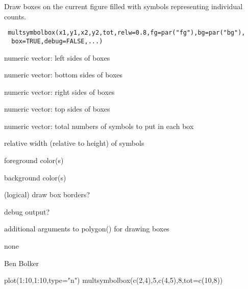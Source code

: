 \begin{Description}\relax
Draw boxes on the current figure filled with symbols representing
individual counts.
\end{Description}
\begin{Usage}
\begin{verbatim}
 multsymbolbox(x1,y1,x2,y2,tot,relw=0.8,fg=par("fg"),bg=par("bg"),
  box=TRUE,debug=FALSE,...)
\end{verbatim}
\end{Usage}
\begin{Arguments}
\begin{ldescription}
\item[\code{x1}] numeric vector: left sides of boxes
\item[\code{y1}] numeric vector: bottom sides of boxes
\item[\code{x2}] numeric vector: right sides of boxes
\item[\code{y2}] numeric vector: top sides of boxes
\item[\code{tot}] numeric vector: total numbers of symbols to put in each box
\item[\code{relw}] relative width (relative to height) of symbols
\item[\code{fg}] foreground color(s)
\item[\code{bg}] background color(s)
\item[\code{box}] (logical) draw box borders?
\item[\code{debug}] debug output?
\item[\code{...}] additional arguments to polygon() for drawing boxes
\end{ldescription}
\end{Arguments}
\begin{Value}
none
\end{Value}
\begin{Author}\relax
Ben Bolker
\end{Author}
\begin{Examples}
\begin{ExampleCode}
 plot(1:10,1:10,type="n")
 multsymbolbox(c(2,4),5,c(4,5),8,tot=c(10,8))
\end{ExampleCode}
\end{Examples}


